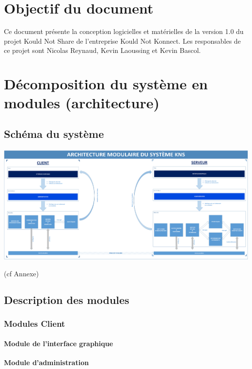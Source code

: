 \documentclass[10pt,a4paper]{report}
\begin{document}



\section{Objectif du document}
Ce document présente la conception logicielles et matérielles de la version 1.0 du projet Kould Not Share de l'entreprise Kould Not Konnect. Les responsables de ce projet sont Nicolas Reynaud, Kevin Laoussing et Kevin Bascol.

\section{Décomposition du système en modules (architecture)}

\subsection{Schéma du système}
\begin{center}
\includegraphics[scale=0.23]{Ressources/modules_KNS.png}
\end{center}
(cf Annexe)
\subsection{Description des modules}

\subsubsection{Modules Client}

	\paragraph{Module de l'interface graphique}
	
	
	\paragraph{Module d'administration}
	
\end{document}
